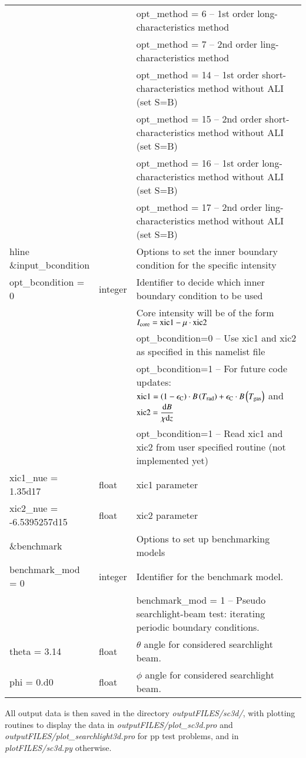 \documentclass[10pt,a4paper]{article}
\begin{document}
\begin{footnotesize}
\begin{longtable}[h]{p{0.24\linewidth}p{0.07\linewidth}p{0.69\linewidth}}
& & opt\_method = 6 -- 1st order long-characteristics method \\
& & opt\_method = 7 -- 2nd order ling-characteristics method \\
& & opt\_method = 14 -- 1st order short-characteristics method without ALI (set S=B) \\
& & opt\_method = 15 -- 2nd order short-characteristics method without ALI (set S=B)  \\
& & opt\_method = 16 -- 1st order long-characteristics method without ALI (set S=B)  \\
& & opt\_method = 17 -- 2nd order ling-characteristics method without ALI (set S=B)  \\hline
%
\&input\_bcondition & & Options to set the inner boundary condition for the specific intensity \\
opt\_bcondition = 0 & integer & Identifier to decide which inner boundary condition to be used \\
& & Core intensity will be of the form $I_{\rm core} = {\rm xic1} - \mu \cdot {\rm xic2}$ \\
& & opt\_bcondition=0 -- Use xic1 and xic2 as specified in this namelist file \\
& & opt\_bcondition=1 -- For future code updates: ${\rm xic1} = \left(1-\epsilon_{\rm C}\right)\cdot B\left(T_{\rm rad}\right) + \epsilon_{\rm C} \cdot B\left(T_{\rm gas}\right)$ and ${\rm xic2} = \dfrac{{\rm d} B}{\chi {\rm d} z}$ \\
& & opt\_bcondition=1 -- Read xic1 and xic2 from user specified routine (not implemented yet) \\
xic1\_nue = 1.35d17 & float & xic1 parameter \\
xic2\_nue = -6.5395257d15 & float & xic2 parameter \\\hline
%
\&benchmark & & Options to set up benchmarking models \\
benchmark\_mod = 0 & integer & Identifier for the benchmark model. \\
& & benchmark\_mod = 1 -- Pseudo searchlight-beam test: iterating periodic boundary conditions. \\
theta = 3.14 & float & $\theta$ angle for considered searchlight beam. \\
phi = 0.d0 & float & $\phi$ angle for considered searchlight beam. \\
%
\end{longtable}
\end{footnotesize}
%
All output data is then saved in the directory \textit{outputFILES/sc3d/},
with plotting routines to display the data in
\textit{outputFILES/plot\_sc3d.pro} and
\textit{outputFILES/plot\_searchlight3d.pro} for pp test problems, and
in \textit{plotFILES/sc3d.py} otherwise.
%
%
%
\end{document}
